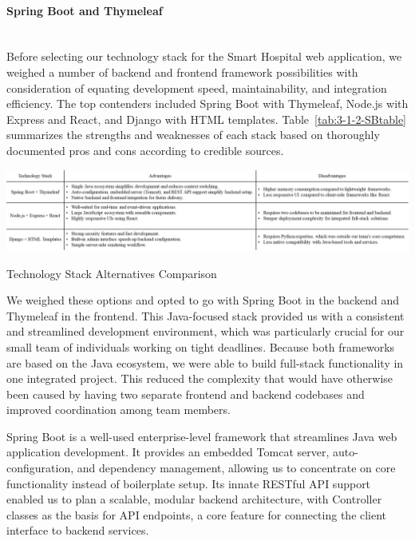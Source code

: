 \paragraph{Spring Boot and Thymeleaf}\mbox{}\\
Before selecting our technology stack for the Smart Hospital web application, we weighed a number of backend and frontend framework possibilities with consideration of equating development speed, maintainability, and integration efficiency. The top contenders included Spring Boot with Thymeleaf, Node.js with Express and React, and Django with HTML templates. Table~\ref{tab:3-1-2-SBtable} summarizes the strengths and weaknesses of each stack based on thoroughly documented pros and cons according to credible sources.

\begin{table}[H]
  \centering
  \includegraphics[width=0.8\linewidth]{images03/3-1-2-springbootTable.png} 
  \caption{Technology Stack Alternatives Comparison}
  \label{tab:3-1-2-SBtable}
\end{table}

We weighed these options and opted to go with Spring Boot in the backend and Thymeleaf in the frontend. This Java-focused stack provided us with a consistent and streamlined development environment, which was particularly crucial for our small team of individuals working on tight deadlines. Because both frameworks are based on the Java ecosystem, we were able to build full-stack functionality in one integrated project. This reduced the complexity that would have otherwise been caused by having two separate frontend and backend codebases and improved coordination among team members.\cite{Simplilearn-Nodejs-SB}

Spring Boot is a well-used enterprise-level framework that streamlines Java web application development. It provides an embedded Tomcat server, auto-configuration, and dependency management, allowing us to concentrate on core functionality instead of boilerplate setup.\cite{GFG-Djanggo-SB} Its innate RESTful API support enabled us to plan a scalable, modular backend architecture, with Controller classes as the basis for API endpoints, a core feature for connecting the client interface to backend services.

